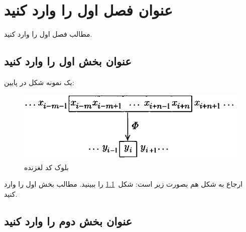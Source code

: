 %
%
%
%
\chapter{
عنوان فصل اول را وارد کنید  
}\label{chap1} 

مطالب فصل اول را وارد کنید.

\section{
عنوان بخش اول را وارد کنید  
}\label{sec11} 

یک نمونه شکل در پایین:

\begin{figure}
\centering
\includegraphics[scale=0.6]{S1}
\caption{بلوک کد لغزنده}
\label{Slide}
\end{figure}

ارجاع به شکل هم بصورت زیر است: شکل~\ref{Slide} را ببینید.
مطالب بخش اول را وارد کنید.

\section{
عنوان بخش دوم را وارد کنید  
}\label{sec12} 

